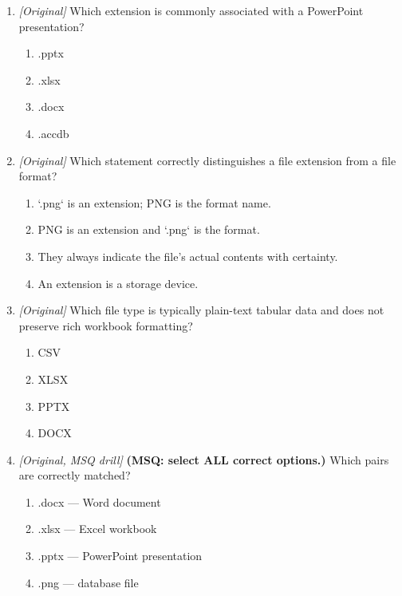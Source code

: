 \begin{enumerate}[label=\textbf{Q\arabic*.}, leftmargin=*]
\item \textit{[Original]} Which extension is commonly associated with a PowerPoint presentation?
  \begin{enumerate}[label=\Alph*.]
\item .pptx
   \item .xlsx
   \item .docx
   \item .accdb
  \end{enumerate}

\item \textit{[Original]} Which statement correctly distinguishes a file extension from a file format?
  \begin{enumerate}[label=\Alph*.]
\item `.png` is an extension; PNG is the format name.
   \item PNG is an extension and `.png` is the format.
   \item They always indicate the file's actual contents with certainty.
   \item An extension is a storage device.
  \end{enumerate}

\item \textit{[Original]} Which file type is typically plain-text tabular data and does not preserve rich workbook formatting?
  \begin{enumerate}[label=\Alph*.]
\item CSV
   \item XLSX
   \item PPTX
   \item DOCX
  \end{enumerate}

\item \textit{[Original, MSQ drill]} \textbf{(MSQ: select ALL correct options.)} Which pairs are correctly matched?
  \begin{enumerate}[label=\Alph*.]
\item .docx --- Word document
   \item .xlsx --- Excel workbook
   \item .pptx --- PowerPoint presentation
   \item .png --- database file
  \end{enumerate}

\end{enumerate}

